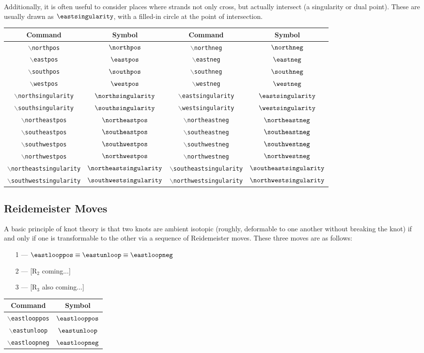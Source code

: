 \documentclass[12pt]{article}
\newcommand{\cn}[1]{$\backslash$\texttt{#1}}
\begin{document}
Additionally, it is often useful to consider places where strands not only cross, but actually intersect (a singularity or dual point).  These are usually drawn as $\eastsingularity$, with a filled-in circle at the point of intersection.

\begin{center}
\begin{tabular}{|cc||cc|}
\hline
Command & Symbol & Command & Symbol \\
\hline\hline
\cn{northpos} & $\northpos$ & \cn{northneg} & $\northneg$ \\
\cn{eastpos} & $\eastpos$ & \cn{eastneg} & $\eastneg$ \\
\cn{southpos} & $\southpos$ & \cn{southneg} & $\southneg$ \\
\cn{westpos} & $\westpos$ & \cn{westneg} & $\westneg$ \\
\cn{northsingularity} & $\northsingularity$ & \cn{eastsingularity} & $\eastsingularity$ \\
\cn{southsingularity} & $\southsingularity$ & \cn{westsingularity} & $\westsingularity$ \\
\cn{northeastpos} & $\northeastpos$ & \cn{northeastneg} & $\northeastneg$ \\
\cn{southeastpos} & $\southeastpos$ & \cn{southeastneg} & $\southeastneg$ \\
\cn{southwestpos} & $\southwestpos$ & \cn{southwestneg} & $\southwestneg$ \\
\cn{northwestpos} & $\northwestpos$ & \cn{northwestneg} & $\northwestneg$ \\
\cn{northeastsingularity} & $\northeastsingularity$ & \cn{southeastsingularity} & $\southeastsingularity$ \\
\cn{southwestsingularity} & $\southwestsingularity$ & \cn{northwestsingularity} & $\northwestsingularity$ \\
\hline
\end{tabular}
\end{center}

\subsection{Reidemeister Moves}
A basic principle of knot theory is that two knots are ambient isotopic (roughly, deformable to one another without breaking the knot) if and only if one is transformable to the other via a sequence of Reidemeister moves.  These three moves are as follows:
\begin{itemize}
  \item[1 ---] $\displaystyle \eastlooppos \equiv \eastunloop \equiv \eastloopneg$
  \item[2 ---] [R$_2$ coming...]
  \item[3 ---] [R$_3$ also coming...]
\end{itemize}

\begin{center}
\begin{tabular}{|cc|}
\hline
Command & Symbol \\
\hline\hline
\cn{eastlooppos} & $\eastlooppos$ \\
\cn{eastunloop} & $\eastunloop$ \\
\cn{eastloopneg} & $\eastloopneg$ \\
\hline
\end{tabular}
\end{center}
\end{document}
